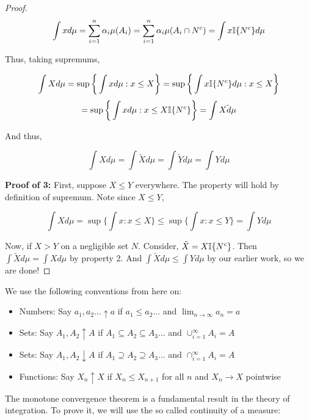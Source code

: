 \begin{proof}
            \[ \int x d\mu = \sum_{i=1}^n \alpha_i \mu(A_i) =  \sum_{i=1}^n \alpha_i \mu(A_i \cap N^c) = \int x\mathbb I\{N^c\} d\mu  \]

            Thus, taking supremums, 

            \[ \int Xd\mu = \sup\bigg\{\int xd\mu : x \leq X \bigg\} = \sup\bigg\{\int x \mathbb I\{N^c\}d\mu : x \leq X \bigg\} \] 
            \[ = \sup\bigg\{\int x d\mu : x \leq X\mathbb I\{N^c\} \bigg\} = \int \tilde{Xd\mu} \]

            And thus, 

            \[ \int X d\mu = \int \tilde{X}d\mu = \int \tilde{Y}d\mu = \int Y d\mu \]

            \textbf{Proof of 3:} First, suppose $X \leq Y$ everywhere. The property will hold by definition of supremum. Note since $X \leq Y$, 

            \[ \int X d\mu = \sup\bigg\{ \int x : x \leq X\bigg\} \leq \sup\bigg\{ \int x : x \leq Y \bigg\} = \int Y d\mu \]

            Now, if $X > Y$ on a negligible set $N$. Consider, $\tilde{X} = X\mathbb I\{N^c\}$. Then 
            $\int \tilde{X}d\mu = \int X d\mu$ by property 2. And $\int \tilde{X}d\mu \leq \int Y d\mu$ by our earlier work, 
            so we are done!
        \end{proof}


    \begin{definition}
        We use the following conventions from here on: 
        \begin{itemize}
            \item Numbers: Say $a_1,a_2... \uparrow a$ if $a_1 \leq a_2...$ and $\lim_{n\to \infty}a_n = a$
            \item Sets: Say $A_1, A_2 \uparrow A$ if $A_1 \subseteq A_2 \subseteq A_3$... and $\cup_{i=1}^\infty A_i  = A$
            \item Sets: Say $A_1, A_2 \downarrow A$ if $A_1 \supseteq A_2 \supseteq A_3$... and $\cap_{i=1}^\infty A_i  = A$
            \item Functions: Say $X_n \uparrow X$ if $X_n \leq X_{n+1}$ for all $n$ and $X_n \to X$ pointwise
        \end{itemize}
    \end{definition}

    The monotone convergence theorem is a fundamental result in the theory of integration. 
    To prove it, we will use the so called continuity of a measure: 

